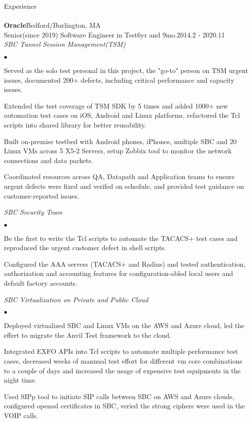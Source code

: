 \documentclass[10pt]{article}
\newcommand{\lineunder}{\vspace*{-8pt}\\\hspace*{-18pt}\hrulefill\\}
\newcommand{\header}[1]{{\hspace*{-15pt}\vspace*{6pt}\large{{#1}}}\vspace*{-6pt}\lineunder}
\newcommand{\company}[5]{
    \large{\textbf{#1}}\hfill \small{#3}\\
    #2\hfill \small{#4}\small{#5}\\
}
\newcommand{\project}[1]{\checkmark\normalsize{{\emph{#1}}}\\}
\newenvironment{achievements}
    {\begin{list}
        {$\bullet$}{\topsep 0pt \itemsep -1pt}} 
    {\end{list}}
\begin{document}
\vspace*{10pt}


\header{Experience}


\company{Oracle}{Senior(since 2019) Software Engineer in Test}{Bedford/Burlington, MA}{6yr and 9mo.}{2014.2 - 2020.11}

\project{SBC Tunnel Session Management(TSM)}
  \begin{achievements}
\item Served as the solo test personal in this project, the "go-to" person on TSM urgent issues, documented 200+ defects, including critical performance and capacity issues.
\item Extended the test coverage of TSM SDK by 5 times and added 1000+ new automation test cases on iOS, Android and Linux platforms, refactored the Tcl scripts into shared library for better reusability.
\item Built on-premise testbed with Android phones, iPhones, multiple SBC and 20 Linux VMs across 5 X5-2 Servers, setup Zobbix tool to monitor the network connections and data packets.
\item Coordinated resources across QA, Datapath and Application teams to ensure urgent defects were fixed and verifed on schedule, and provided test guidance on customer-reported issues.
  \end{achievements}


\project{SBC Security Team}
  \begin{achievements}
\item Be the first to write the Tcl scripts to automate the TACACS+ test cases and reproduced the urgent customer defect in shell scripts.
\item Configured the AAA servers (TACACS+ and Radius) and tested authentication, authorization and accounting features for configuration-abled local users and default factory accounts.
  \end{achievements}


  \project{SBC Virtualization on Private and Public Cloud}
  \begin{achievements}
\item Deployed virtualized SBC and Linux VMs on the AWS and Azure cloud, led the effert to migrate the Anvil Test framework to the cloud.
\item Integrated EXFO APIs into Tcl scripts to automate multiple performance test cases, decreased weeks of mannual test effort for different vm core combinations to a couple of days and increased the usage of expensive test equipments in the night time.
\item Used SIPp tool to initiate SIP calls between SBC on AWS and Azure clouds, configured openssl certificates in SBC, veried the strong ciphers were used in the VOIP calls.
  \end{achievements}
\end{document}
